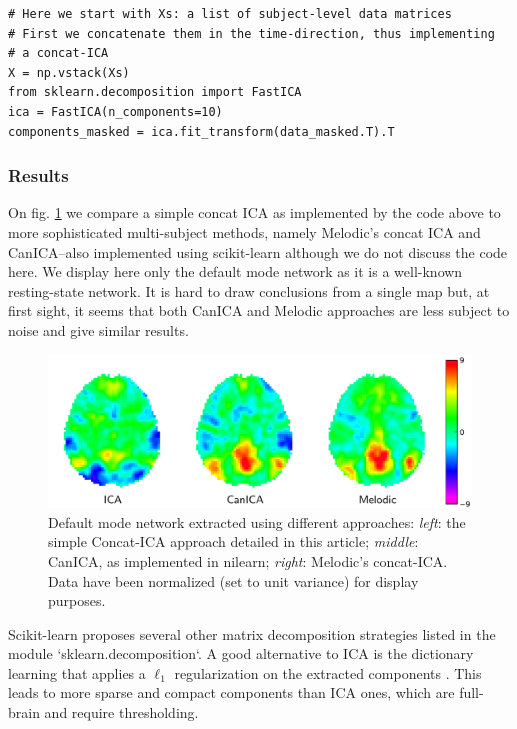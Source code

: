 \documentclass{frontiersSCNS} %
\begin{document}
\begin{lstlisting}
# Here we start with Xs: a list of subject-level data matrices
# First we concatenate them in the time-direction, thus implementing
# a concat-ICA
X = np.vstack(Xs)
from sklearn.decomposition import FastICA
ica = FastICA(n_components=10)
components_masked = ica.fit_transform(data_masked.T).T
\end{lstlisting}

\subsubsection{Results}

On fig. \ref{fig:ica} we compare a simple concat ICA as implemented by
the code above to more sophisticated multi-subject methods, namely Melodic's
concat ICA and CanICA--also implemented using scikit-learn although we do
not discuss the code here. We display here only the default mode network
as it is a well-known resting-state network. It is hard to draw conclusions from
a single map but, at first sight, it seems that both CanICA and Melodic
approaches are less subject to noise and give similar results.

\begin{figure}[hbtp]
  \centerline{\includegraphics[width=.9\linewidth]{ica}}
  \caption{Default mode network extracted using different approaches:
\emph{left}: the simple Concat-ICA approach detailed in this article;
\emph{middle}: CanICA, as implemented in nilearn; \emph{right}: Melodic's
concat-ICA. Data have been normalized (set to unit variance) for display
purposes.}
  \label{fig:ica}
\end{figure}

Scikit-learn proposes several other matrix decomposition strategies listed in
the module `sklearn.decomposition`. A good alternative to ICA is the dictionary
learning that applies a $\ell_1$ regularization on the extracted components
\citep{varoquaux2011}.
This leads to more sparse and compact components than ICA ones, which are
full-brain and require thresholding. 
\end{document}
